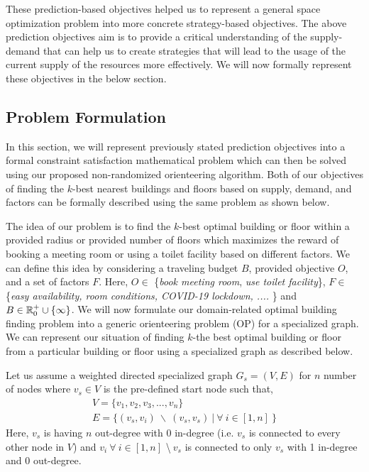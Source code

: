 These prediction-based objectives helped us to represent a general space optimization problem into more concrete strategy-based objectives. The above prediction objectives aim is to provide a critical understanding of the supply-demand that can help us to create strategies that will lead to the usage of the current supply of the resources more effectively. We will now formally represent these objectives in the below section.

\subsection{Problem Formulation} \label{formulation}

In this section, we will represent previously stated prediction objectives into a formal constraint satisfaction mathematical problem which can then be solved using our proposed non-randomized orienteering algorithm. Both of our objectives of finding the $k$-best nearest buildings and floors based on supply, demand, and factors can be formally described using the same problem as shown below.

The idea of our problem is to find the $k$-best optimal building or floor within a provided radius or provided number of floors which maximizes the reward of booking a meeting room or using a toilet facility based on different factors. We can define this idea by considering a traveling budget $B$, provided objective $O$, and a set of factors $F$. Here, $O \in $ \{\textit{book meeting room}, \textit{use toilet facility}\}, $F \in $ \{\textit{easy availability, room conditions, COVID-19 lockdown, ....} \} and $B \in \mathbb{R}_0^+ \cup \{\infty\}$. We will now formulate our domain-related optimal building finding problem into a generic orienteering problem (OP) for a specialized graph. We can represent our situation of finding $k$-the best optimal building or floor from a particular building or floor using a specialized graph as described below.

Let us assume a weighted directed specialized graph $G_s = (V,E)$ for $n$ number of nodes where $v_s \in V$ is the pre-defined start node such that,
\begin{gather}
     V = \{v_1, v_2, v_3,...,v_n\} \\
    E = \{(v_s, v_i)\:\backslash\:(v_s, v_s)\:|\:\forall\:i \in [1,n]\:\}
\end{gather}
Here, $v_s$ is having $n$ out-degree with 0 in-degree (i.e. $v_s$ is connected to every other node in $V$) and $v_i\:\forall\:i \in [1,n]$ \textbackslash $\:v_s$ is connected to only $v_s$ with 1 in-degree and 0 out-degree. 

